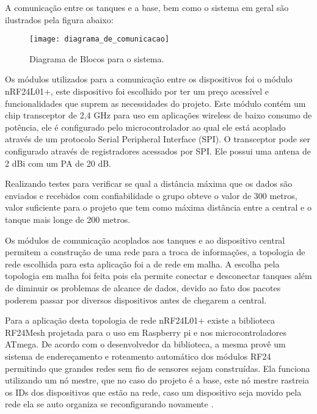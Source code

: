 A comunicação entre os tanques e a base, bem como o sistema em geral são ilustrados pela figura abaixo:

\begin{figure}[!h]
\centering \texttt{[image: diagrama\_de\_comunicacao]}
\caption{Diagrama de Blocos para o sistema.}
\label{diagramacomunicacao}
 \end{figure}

\pagebreak

Os módulos utilizados para a comunicação entre os dispositivos foi o módulo nRF24L01+, este dispositivo foi escolhido por ter um preço acessível e funcionalidades que suprem as necessidades do projeto. Este módulo contém um chip transceptor de 2,4 GHz para uso em aplicações wireless de baixo consumo de potência, ele é configurado pelo microcontrolador ao qual ele está acoplado através de um protocolo Serial Peripheral Interface (SPI). O transceptor pode ser  configurado através de registradores acessados por SPI. Ele possui uma antena de 2 dBi com um PA de 20 dB.

Realizando testes para verificar se qual a distância máxima que os dados são enviados e recebidos com confiabilidade o grupo obteve o valor de 300 metros, valor suficiente para o projeto que tem como máxima distância entre a central e o tanque mais longe de 200 metros.

Os módulos de comunicação acoplados aos tanques e ao dispositivo central permitem a construção de uma rede para a troca de informações, a topologia de rede escolhida para esta aplicação foi a de rede em malha. A escolha pela topologia em malha foi feita pois ela permite conectar e desconectar tanques além de diminuir os problemas de alcance de dados, devido ao fato dos pacotes poderem passar por diversos dispositivos antes de chegarem a central.

Para a aplicação desta topologia de rede nRF24L01+ existe a biblioteca RF24Mesh projetada para o uso em Raspberry pi e nos microcontroladores ATmega. De acordo com o desenvolvedor da biblioteca, a mesma provê um sistema de endereçamento e roteamento automático dos módulos RF24 permitindo que grandes redes sem fio de sensores sejam construídas. Ela funciona utilizando um nó mestre, que no caso do projeto é a base, este nó mestre rastreia os IDs dos dispositivos que estão na rede, caso um dispositivo seja movido pela rede ela se auto organiza se reconfigurando novamente \cite{meshnetwork}.

